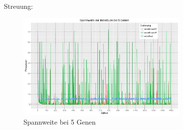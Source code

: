 \documentclass[12pt,
    a4paper,
    headinclude,
    footinclude]{scrreprt}
\begin{document}
Streuung:	
		\begin{figure}[H]
		\includegraphics[width=0.75\textwidth]{spannweite-5-gene.jpeg} 
		
		\caption*{Spannweite bei 5 Genen} 
		\label{InputOutput}
	\end{figure}


	
	

	

	
	

	

	


	

	
	
	



	
	
	
	
	
\end{document}

